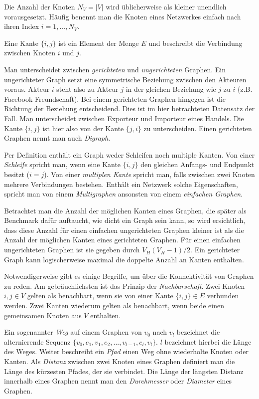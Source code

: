 \documentclass[a4paper,ngerman,oneside,titlepage,bibliography=totoc,11pt]{scrreprt}
\begin{document}
Die Anzahl der Knoten $N_V = |V|$ wird üblicherweise als kleiner unendlich vorausgesetzt. Häufig benennt man die Knoten eines Netzwerkes einfach nach ihren Index $i = 1, ..., N_V$.

Eine Kante $\{i,j\}$ ist ein Element der Menge $E$ und  beschreibt die Verbindung zwischen Knoten $i$ und $j$.

Man unterscheidet zwischen \emph{gerichteten} und \emph{ungerichteten} Graphen. Ein ungerichteter Graph setzt eine symmetrische Beziehung zwischen den Akteuren voraus. Akteur $i$ steht also zu Akteur $j$ in der gleichen Beziehung wie $j$ zu $i$ (z.B. Facebook Freundschaft). Bei einem gerichteten Graphen hingegen ist die Richtung der Beziehung entscheidend. Dies ist im hier betrachteten Datensatz der Fall. Man unterscheidet zwischen Exporteur und Importeur eines Handels. Die Kante $\{i,j\}$ ist hier also von der Kante $\{j,i\}$ zu unterscheiden. Einen gerichteten Graphen nennt man auch \emph{Digraph}.

Per Definition enthält ein Graph weder Schleifen noch multiple Kanten. Von einer \emph{Schleife} spricht man, wenn eine Kante $\{i,j\}$ den gleichen Anfangs- und Endpunkt besitzt ($i = j$). Von einer \emph{multiplen Kante} spricht man, falls zwischen zwei Knoten mehrere Verbindungen bestehen. Enthält ein Netzwerk solche Eigenschaften, spricht man von einem \emph{Multigraphen} ansonsten von einem \emph{einfachen Graphen}.

Betrachtet man die Anzahl der möglichen Kanten eines Graphen, die später als Benchmark dafür auftaucht, wie dicht ein Graph sein kann, so wird ersichtlich, dass diese Anzahl für einen einfachen ungerichteten Graphen kleiner ist als die Anzahl der möglichen Kanten eines gerichteten Graphen. Für einen einfachen ungerichteten Graphen ist sie gegeben durch $V_H(V_H-1)/2$. Ein gerichteter Graph kann logischerweise maximal die doppelte Anzahl an Kanten enthalten.

Notwendigerweise gibt es einige Begriffe, um über die Konnektivität von Graphen zu reden. Am gebräuchlichsten ist das Prinzip der \emph{Nachbarschaft}. Zwei Knoten $ i,j \in V$ gelten als benachbart, wenn sie von einer Kante $\{i,j\} \in E$ verbunden werden. Zwei Kanten wiederum gelten als benachbart, wenn beide einen gemeinsamen Knoten aus $V$ enthalten.

Ein sogenannter \emph{Weg} auf einem Graphen von $v_0$ nach $v_l$ bezeichnet die alternierende Sequenz $\{v_0, e_1, v_1, e_2, ..., v_{l-1}, e_l, v_l\}$. $l$ bezeichnet hierbei die Länge des Weges. Weiter beschreibt ein \emph{Pfad} einen Weg ohne wiederholte Knoten oder Kanten. Als \emph{Distanz} zwischen zwei Knoten eines Graphen definiert man die Länge des kürzesten Pfades, der sie verbindet. Die Länge der längsten Distanz innerhalb eines Graphen nennt man den \emph{Durchmesser} oder \emph{Diameter} eines Graphen.
\end{document}
